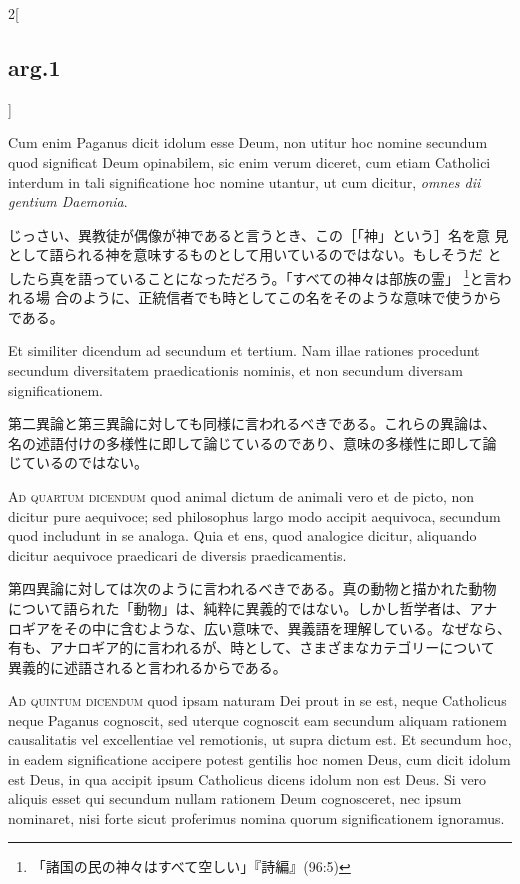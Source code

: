\documentclass[paper=a4paper,fontsize=10pt,jafontsize=9pt,titlepage]{jlreq}
\begin{document}
\begin{paracol}{2}[\subsection{arg.1}]
\switchcolumn*

Cum enim Paganus dicit idolum esse Deum, non utitur hoc nomine
secundum quod significat Deum opinabilem, sic enim verum diceret, cum
etiam Catholici interdum in tali significatione hoc nomine utantur, ut
cum dicitur, {\itshape omnes dii gentium Daemonia}.

\switchcolumn

じっさい、異教徒が偶像が神であると言うとき、この［「神」という］名を意
見として語られる神を意味するものとして用いているのではない。もしそうだ
としたら真を語っていることになっただろう。「すべての神々は部族の霊」
\footnote{「諸国の民の神々はすべて空しい」『詩編』(96:5)}と言われる場
合のように、正統信者でも時としてこの名をそのような意味で使うからである。

\switchcolumn*

Et similiter dicendum ad secundum et tertium. Nam illae rationes
procedunt secundum diversitatem praedicationis nominis, et non
secundum diversam significationem.

\switchcolumn

第二異論と第三異論に対しても同様に言われるべきである。これらの異論は、
名の述語付けの多様性に即して論じているのであり、意味の多様性に即して論
じているのではない。

\switchcolumn*[\subsection{ad.4}]

{\scshape Ad quartum dicendum} quod animal dictum de animali vero et
de picto, non dicitur pure aequivoce; sed philosophus largo modo
accipit aequivoca, secundum quod includunt in se analoga. Quia et ens,
quod analogice dicitur, aliquando dicitur aequivoce praedicari de
diversis praedicamentis.

\switchcolumn

第四異論に対しては次のように言われるべきである。真の動物と描かれた動物
について語られた「動物」は、純粋に異義的ではない。しかし哲学者は、アナ
ロギアをその中に含むような、広い意味で、異義語を理解している。なぜなら、
有も、アナロギア的に言われるが、時として、さまざまなカテゴリーについて
異義的に述語されると言われるからである。

\switchcolumn*[\subsection{ad.5}]

{\scshape Ad quintum dicendum} quod ipsam naturam Dei prout in se est,
neque Catholicus neque Paganus cognoscit, sed uterque cognoscit eam
secundum aliquam rationem causalitatis vel excellentiae vel
remotionis, ut supra dictum est. Et secundum hoc, in eadem
significatione accipere potest gentilis hoc nomen Deus, cum dicit
idolum est Deus, in qua accipit ipsum Catholicus dicens idolum non est
Deus. Si vero aliquis esset qui secundum nullam rationem Deum
cognosceret, nec ipsum nominaret, nisi forte sicut proferimus nomina
quorum significationem ignoramus.


\end{paracol}
\end{document}
